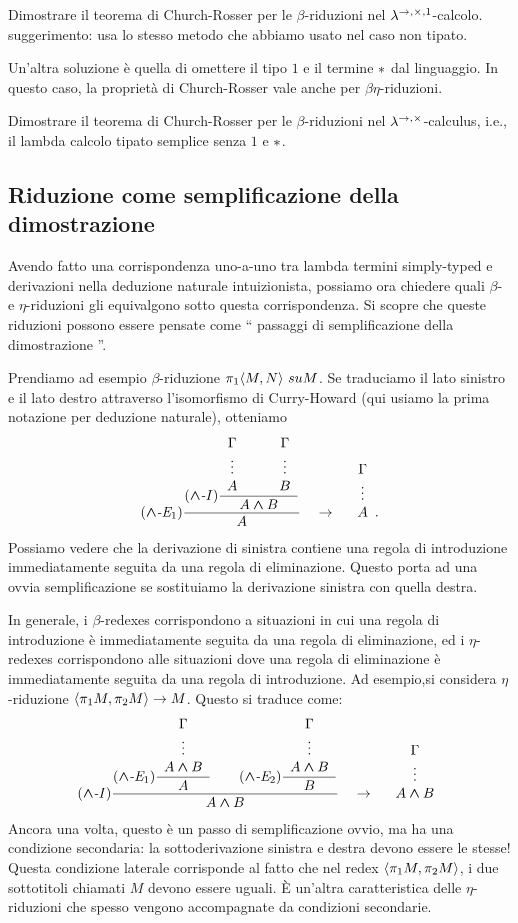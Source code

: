 \documentclass{article}
\begin{document}
\begin{exercise}
  Dimostrare il teorema di Church-Rosser per le $\beta$-riduzioni nel
  $\lambda^{\to,\times,1}$-calcolo. suggerimento: usa lo stesso metodo che abbiamo usato nel caso non tipato.
\end{exercise}

Un'altra soluzione \`e quella di omettere il tipo $1$ e il termine ${*}$ dal
linguaggio. In questo caso, la propriet\`a di Church-Rosser vale anche per
$\beta\eta$-riduzioni.

\begin{exercise}
  Dimostrare il teorema di Church-Rosser per le $\beta$-riduzioni nel
  $\lambda^{\to,\times}$-calculus, i.e., il lambda calcolo tipato semplice 
 senza $1$ e ${*}$.
\end{exercise}

\subsection{Riduzione come semplificazione della dimostrazione}

Avendo fatto una corrispondenza uno-a-uno tra lambda termini simply-typed
e derivazioni nella deduzione naturale intuizionista, possiamo ora chiedere 
quali $\beta$- e $\eta$-riduzioni gli equivalgono sotto questa corrispondenza.
Si scopre che queste riduzioni possono essere pensate come `` passaggi di semplificazione della dimostrazione ''.

Prendiamo ad esempio $\beta$-riduzione $\pi_1\langle M,N\rangle\ su M $.
Se traduciamo il lato sinistro e il lato destro attraverso l'isomorfismo di Curry-Howard 
(qui usiamo la prima notazione per deduzione naturale), otteniamo
\[ \trule{$\cand$-E$_1$}\deriv{\trule{$\cand$-I}\deriv{\ideriv{\Gamma}{A}\sep\ideriv{\Gamma}{B}}{A\cand B}}{A}
\ssep\to\ssep \ideriv{\Gamma}{A}.
\]
Possiamo vedere che la derivazione di sinistra contiene una regola di 
introduzione immediatamente seguita da una regola di eliminazione. 
Questo porta ad una ovvia semplificazione se sostituiamo la derivazione sinistra con quella destra.

In generale, i $\beta$-redexes corrispondono a situazioni in cui
una regola di introduzione \`e immediatamente seguita da una regola di 
eliminazione, ed i $\eta$-redexes corrispondono alle situazioni dove 
una regola di eliminazione \`e immediatamente seguita da una regola di introduzione.
Ad esempio,si considera $\eta$-riduzione  $\langle\pi_1 M,\pi_2 M\rangle \to M$. 
Questo si traduce come:
\[
\trule{$\cand$-I}\deriv{\trule{$\cand$-E$_1$}\deriv{\ideriv{\Gamma}{A\cand
      B}}{A}\sep\trule{$\cand$-E$_2$}\deriv{\ideriv{\Gamma}{A\cand
      B}}{B}}{A\cand B}
\ssep\to\ssep \ideriv{\Gamma}{A\cand B}
\]
Ancora una volta, questo \`e un passo di semplificazione ovvio, ma ha una condizione secondaria: 
la sottoderivazione sinistra e destra devono essere le stesse! 
Questa condizione laterale corrisponde al fatto che nel redex $\langle\pi_1
M,\pi_2 M\rangle$, i due sottotitoli chiamati $M$ devono essere uguali.
\`E un'altra caratteristica delle $\eta$-riduzioni che spesso vengono accompagnate 
da condizioni secondarie.
\end{document}
